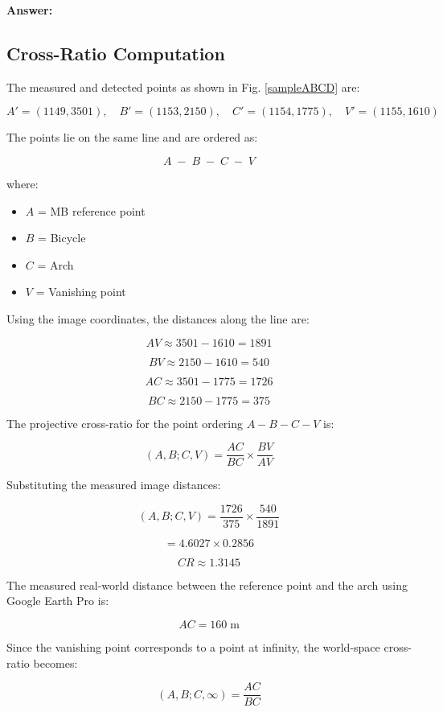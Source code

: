 \begin{studentSpace}
    
\textbf{Answer:}
\subsection*{Cross-Ratio Computation}

The measured and detected points as shown in Fig. \ref{sampleABCD} are:

\[
A' = (1149,3501), \quad
B' = (1153,2150), \quad
C' = (1154,1775), \quad
V' = (1155,1610)
\]

The points lie on the same line and are ordered as:

\[
A \;-\; B \;-\; C \;-\; V
\]

where:

\begin{itemize}
    \item $A$ = MB reference point
    \item $B$ = Bicycle
    \item $C$ = Arch
    \item $V$ = Vanishing point
\end{itemize}

Using the image coordinates, the distances along the line are:

\[
AV \approx 3501 - 1610 = 1891
\]

\[
BV \approx 2150 - 1610 = 540
\]

\[
AC \approx 3501 - 1775 = 1726
\]

\[
BC \approx 2150 - 1775 = 375
\]

The projective cross-ratio for the point ordering
$A-B-C-V$ is:

\[
(A,B;C,V)
=
\frac{AC}{BC}
\times
\frac{BV}{AV}
\]

Substituting the measured image distances:

\[
(A,B;C,V)
=
\frac{1726}{375}
\times
\frac{540}{1891}
\]

\[
=
4.6027 \times 0.2856
\]

\[
\boxed{CR \approx 1.3145}
\]

The measured real-world distance between the reference point and the arch using Google Earth Pro is:

\[
AC = 160 \; \text{m}
\]

Since the vanishing point corresponds to a point at infinity, the world-space cross-ratio becomes:

\[
(A,B;C,\infty)
=
\frac{AC}{BC}
\]


\end{studentSpace}
